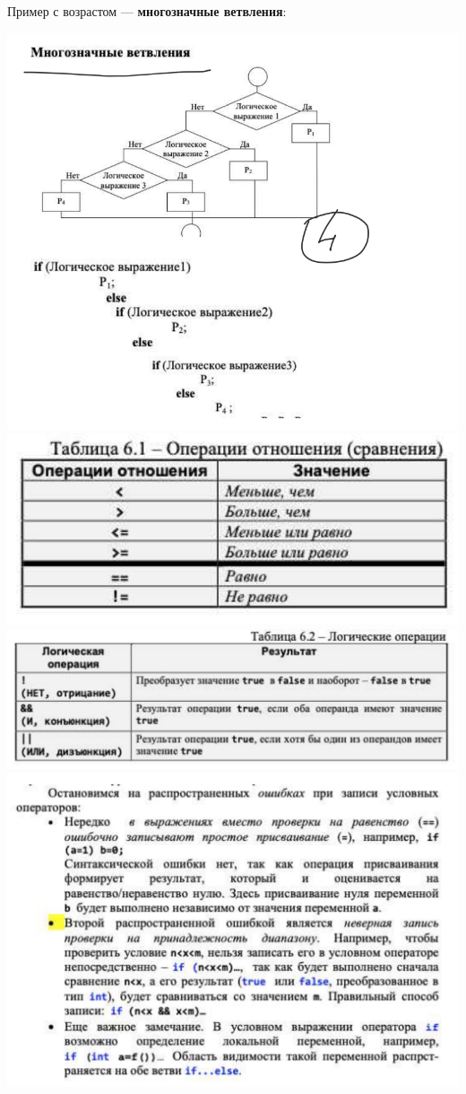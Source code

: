 \documentclass{article}
\begin{document}
\pagebreak
Пример с возрастом — \textbf{многозначные ветвления}:

\begin{center}
    \includegraphics[width=\textwidth]{images/image_01.png}
    \includegraphics[width=\textwidth]{images/image_02.png}
    \includegraphics[width=\textwidth]{images/image_03.png}
    \includegraphics[width=\textwidth]{images/image_04.png}

\end{center}
\end{document}

